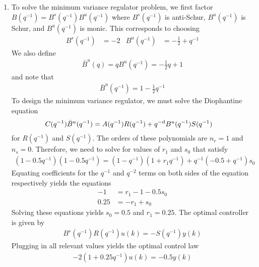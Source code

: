 \begin{enumerate}
    \item
    To solve the minimum variance regulator problem, we first factor $B(q^{-1}) = B^s(q^{-1}) B^u(q^{-1})$ where $B^s(q^{-1})$ is anti-Schur, $B^u(q^{-1})$ is Schur, and $B^u(q^{-1})$ is monic. This corresponds to choosing
    \begin{align*}
        B^s(q^{-1}) & = -2
            & B^u(q^{-1}) & = -\frac{1}{2} + q^{-1}
    \end{align*}
    We also define 
    \begin{align*}
        \bar{B}^u(q) = q B^u(q^{-1}) = -\frac{1}{2} q + 1
    \end{align*}
    and note that
    \begin{align*}
        \bar{B}^u(q^{-1}) = 1 - \frac{1}{2} q^{-1}
    \end{align*}
    To design the minimum variance regulator, we must solve the Diophantine equation
    \begin{align*}
        C(q^{-1}) \bar{B}^u(q^{-1}) & = A(q^{-1}) R(q^{-1}) + q^{-\textrm{d}} B^u(q^{-1}) S(q^{-1})
    \end{align*}
    for $R(q^{-1})$ and $S(q^{-1})$. The orders of these polynomials are $n_r = 1$ and $n_s = 0$. Therefore, we need to solve for values of $r_1$ and $s_0$ that satisfy
    \begin{align*}
        (1 - 0.5 q^{-1})(1-0.5 q^{-1}) = (1 - q^{-1}) (1 + r_1 q^{-1}) + q^{-1} (-0.5 + q^{-1}) s_0
    \end{align*}
    Equating coefficients for the $q^{-1}$ and $q^{-2}$ terms on both sides of the equation respectively yields the equations
    \begin{align*}
        -1 & = r_1 - 1 - 0.5 s_0 \\
        0.25 & = -r_1 + s_0
    \end{align*}
    Solving these equations yields $s_0 = 0.5$ and $r_1 = 0.25$. The optimal controller is given by
    \begin{gather*}
        B^s(q^{-1}) R(q^{-1}) u(k) = - S(q^{-1}) y(k)
    \end{gather*}
    Plugging in all relevant values yields the optimal control law
    \begin{align*}
        -2 (1 + 0.25 q^{-1}) u(k) = -0.5 y(k)
    \end{align*}

\end{enumerate}
